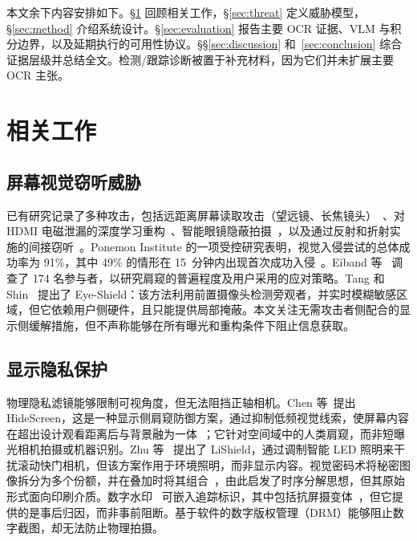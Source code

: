 \documentclass{ieeeaccess}
\begin{document}
本文余下内容安排如下。\S\ref{sec:related} 回顾相关工作，\S\ref{sec:threat} 定义威胁模型，\S\ref{sec:method} 介绍系统设计。\S\ref{sec:evaluation} 报告主要 OCR 证据、VLM 与积分边界，以及延期执行的可用性协议。\S\S\ref{sec:discussion} 和~\ref{sec:conclusion} 综合证据层级并总结全文。检测/跟踪诊断被置于补充材料，因为它们并未扩展主要 OCR 主张。


\section{相关工作}
\label{sec:related}

\subsection{屏幕视觉窃听威胁}

已有研究记录了多种攻击，包括远距离屏幕读取攻击（望远镜、长焦镜头）~\cite{b_backes2009}、对 HDMI 电磁泄漏的深度学习重构~\cite{b_fernandez2024}、智能眼镜隐蔽拍摄~\cite{b_wang2026}，以及通过反射和折射实施的间接窃听~\cite{b_raguram2011}。Ponemon Institute 的一项受控研究表明，视觉入侵尝试的总体成功率为 91\%，其中 49\% 的情形在 15~分钟内出现首次成功入侵~\cite{b_ponemon2016}。Eiband 等~\cite{b_eiband2017} 调查了 174 名参与者，以研究肩窥的普遍程度及用户采用的应对策略。Tang 和 Shin~\cite{b_tang2023} 提出了 Eye-Shield：该方法利用前置摄像头检测旁观者，并实时模糊敏感区域，但它依赖用户侧硬件，且只能提供局部掩蔽。本文关注无需攻击者侧配合的显示侧缓解措施，但不声称能够在所有曝光和重构条件下阻止信息获取。

\subsection{显示隐私保护}

物理隐私滤镜能够限制可视角度，但无法阻挡正轴相机。Chen 等\ 提出 HideScreen，这是一种显示侧肩窥防御方案，通过抑制低频视觉线索，使屏幕内容在超出设计观看距离后与背景融为一体~\cite{b_hidescreen2019}；它针对空间域中的人类肩窥，而非短曝光相机拍摄或机器识别。Zhu 等~\cite{b_zhu2017} 提出了 LiShield，通过调制智能 LED 照明来干扰滚动快门相机，但该方案作用于环境照明，而非显示内容。视觉密码术将秘密图像拆分为多个份额，并在叠加时将其组合~\cite{b_naor1994}，由此启发了时序分解思想，但其原始形式面向印刷介质。数字水印~\cite{b_zhong2023} 可嵌入追踪标识，其中包括抗屏摄变体~\cite{b_fang2019}，但它提供的是事后归因，而非事前阻断。基于软件的数字版权管理（DRM）能够阻止数字截图，却无法防止物理拍摄。
\end{document}
